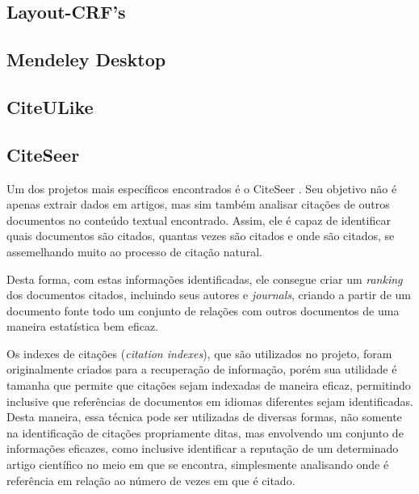 
\subsection{Layout-CRF's}
\label{tec-layout-crfs}


\subsection{Mendeley Desktop}
\label{tec-mendeley}


\subsection{CiteULike}
\label{tec-citeulike}


\subsection{CiteSeer}

Um dos projetos mais específicos encontrados é o CiteSeer \cite{citeseer}. Seu objetivo não é apenas extrair dados em artigos, mas sim também analisar citações de outros documentos no conteúdo textual encontrado. Assim, ele é capaz de identificar quais documentos são citados, quantas vezes são citados e onde são citados, se assemelhando muito ao processo de citação natural.

Desta forma, com estas informações identificadas, ele consegue criar um \textit{ranking} dos documentos citados, incluindo seus autores e \textit{journals}, criando a partir de um documento fonte todo um conjunto de relações com outros documentos de uma maneira estatística bem eficaz.

Os indexes de citações (\textit{citation indexes}), que são utilizados no projeto, foram originalmente criados para a recuperação de informação, porém sua utilidade é tamanha que permite que citações sejam indexadas de maneira eficaz, permitindo inclusive que referências de documentos em idiomas diferentes sejam identificadas. Desta maneira, essa técnica pode ser utilizadas de diversas formas, não somente na identificação de citações propriamente ditas, mas envolvendo um conjunto de informações eficazes, como inclusive identificar a reputação de um determinado artigo científico no meio em que se encontra, simplesmente analisando onde é referência em relação ao número de vezes em que é citado.

